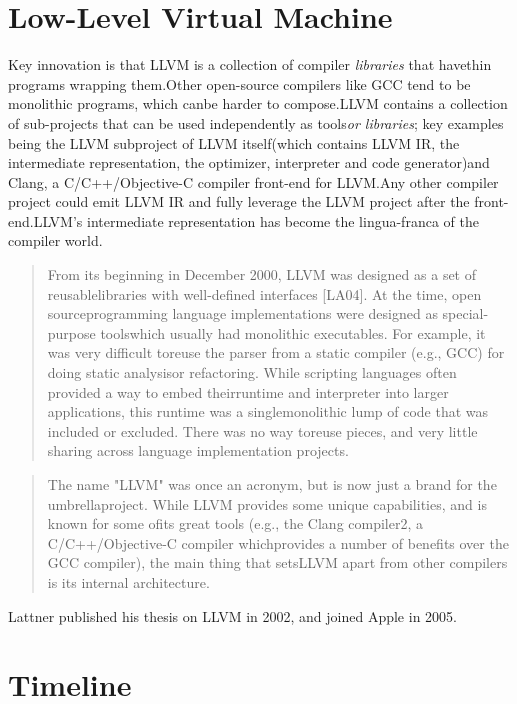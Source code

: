 \section{Low-Level Virtual Machine}
Key 
innovation is that LLVM is a collection of compiler \textit{libraries} that 
havethin programs wrapping them.Other open-source compilers like GCC tend to be 
monolithic programs, which canbe harder to compose.LLVM contains a collection 
of sub-projects that can be used independently as tools\textit{or libraries}; 
key examples being the LLVM subproject of LLVM itself(which contains LLVM IR, 
the intermediate representation, the optimizer, interpreter and code 
generator)and Clang, a C/C++/Objective-C compiler front-end for LLVM.Any other 
compiler project could emit LLVM IR and fully leverage the LLVM project after 
the front-end.LLVM's intermediate representation has become the lingua-franca 
of the compiler world.
\begin{quotation}
From its beginning in December 2000, 
LLVM was designed as a set of reusablelibraries with well-defined interfaces 
[LA04]. At the time, open sourceprogramming language implementations were 
designed as special-purpose toolswhich usually had monolithic executables. For 
example, it was very difficult toreuse the parser from a static compiler (e.g., 
GCC) for doing static analysisor refactoring. While scripting languages often 
provided a way to embed theirruntime and interpreter into larger applications, 
this runtime was a singlemonolithic lump of code that was included or excluded. 
There was no way toreuse pieces, and very little sharing across language 
implementation projects.\cite{aosa_vol1}
\end{quotation}
\begin{quotation}
The 
name "LLVM" was once an acronym, but is now just a brand for the 
umbrellaproject. While LLVM provides some unique capabilities, and is known for 
some ofits great tools (e.g., the Clang compiler2, a C/C++/Objective-C compiler 
whichprovides a number of benefits over the GCC compiler), the main thing that 
setsLLVM apart from other compilers is its internal 
architecture.\cite[LLVM]{aosa_vol1}
\end{quotation}
Lattner published his thesis 
on LLVM in 2002, and joined Apple in 
2005.
\pagebreak\section{Timeline}


